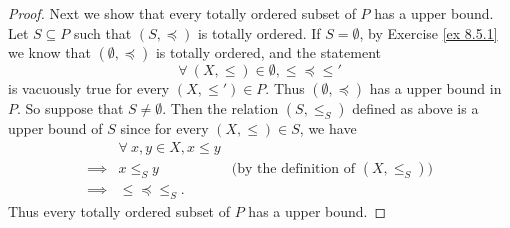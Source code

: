 \begin{proof}
    Next we show that every totally ordered subset of \(P\) has a upper bound.
    Let \(S \subseteq P\) such that \((S, \preceq)\) is totally ordered.
    If \(S = \emptyset\), by Exercise \ref{ex 8.5.1} we know that \((\emptyset, \preceq)\) is totally ordered, and the statement
    \[
        \forall\ (X, \leq) \in \emptyset, \leq \preceq \leq'
    \]
    is vacuously true for every \((X, \leq') \in P\).
    Thus \((\emptyset, \preceq)\) has a upper bound in \(P\).
    So suppose that \(S \neq \emptyset\).
    Then the relation \((S, \leq_S)\) defined as above is a upper bound of \(S\) since for every \((X, \leq) \in S\), we have
    \begin{align*}
                 & \forall\ x, y \in X, x \leq y                                                 \\
        \implies & x \leq_S y                    & \text{(by the definition of \((X, \leq_S)\))} \\
        \implies & \leq \preceq \leq_S.
    \end{align*}
    Thus every totally ordered subset of \(P\) has a upper bound.


\end{proof}
